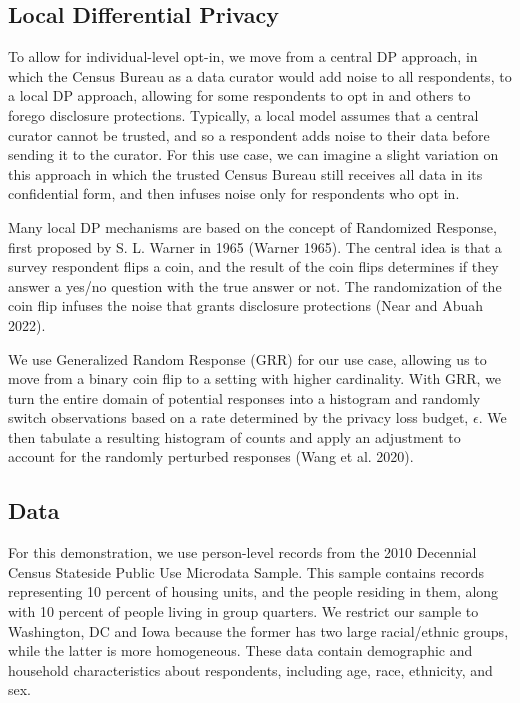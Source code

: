 \documentclass[
]{urban-formatting}
\begin{document}
\subsection{Local Differential Privacy}

To allow for individual-level opt-in, we move from a central DP
approach, in which the Census Bureau as a data curator would add noise
to all respondents, to a local DP approach, allowing for some
respondents to opt in and others to forego disclosure protections.
Typically, a local model assumes that a central curator cannot be
trusted, and so a respondent adds noise to their data before sending it
to the curator. For this use case, we can imagine a slight variation on
this approach in which the trusted Census Bureau still receives all data
in its confidential form, and then infuses noise only for respondents
who opt in.~

Many local DP mechanisms are based on the concept of Randomized
Response, first proposed by S. L. Warner in 1965 (Warner 1965). The
central idea is that a survey respondent flips a coin, and the result of
the coin flips determines if they answer a yes/no question with the true
answer or not. The randomization of the coin flip infuses the noise that
grants disclosure protections (Near and Abuah 2022).

We use Generalized Random Response (GRR) for our use case, allowing us
to move from a binary coin flip to a setting with higher cardinality.
With GRR, we turn the entire domain of potential responses into a
histogram and randomly switch observations based on a rate determined by
the privacy loss budget, \(\epsilon\). We then tabulate a resulting
histogram of counts and apply an adjustment to account for the randomly
perturbed responses (Wang et al. 2020).

\subsection{Data}

For this demonstration, we use person-level records from the 2010
Decennial Census Stateside Public Use Microdata Sample. This sample
contains records representing 10 percent of housing units, and the
people residing in them, along with 10 percent of people living in group
quarters. We restrict our sample to Washington, DC and Iowa because the
former has two large racial/ethnic groups, while the latter is more
homogeneous. These data contain demographic and household
characteristics about respondents, including age, race, ethnicity, and
sex.
\end{document}
